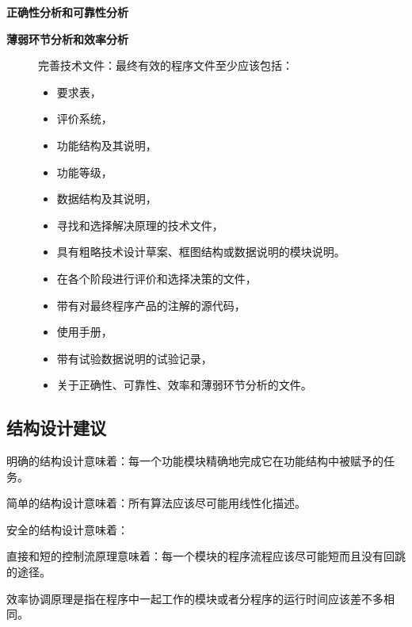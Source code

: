 \documentclass[letterpaper,10pt,english]{sphinxmanual}
\begin{document}
\textbf{正确性分析和可靠性分析}
\begin{description}
\item[{\textbf{薄弱环节分析和效率分析}}] \leavevmode
完善技术文件：最终有效的程序文件至少应该包括：
\begin{itemize}
\item {} 
要求表，

\item {} 
评价系统，

\item {} 
功能结构及其说明，

\item {} 
功能等级，

\item {} 
数据结构及其说明，

\item {} 
寻找和选择解决原理的技术文件，

\item {} 
具有粗略技术设计草案、框图结构或数据说明的模块说明。

\item {} 
在各个阶段进行评价和选择决策的文件，

\item {} 
带有对最终程序产品的注解的源代码，

\item {} 
使用手册，

\item {} 
带有试验数据说明的试验记录，

\item {} 
关于正确性、可靠性、效率和薄弱环节分析的文件。

\end{itemize}

\end{description}


\subsection{结构设计建议}
\label{unit10:id18}
明确的结构设计意味着：每一个功能模块精确地完成它在功能结构中被赋予的任务。

简单的结构设计意味着：所有算法应该尽可能用线性化描述。

安全的结构设计意味着：

直接和短的控制流原理意味着：每一个模块的程序流程应该尽可能短而且没有回跳的途径。

效率协调原理是指在程序中一起工作的模块或者分程序的运行时间应该差不多相同。
\end{document}
